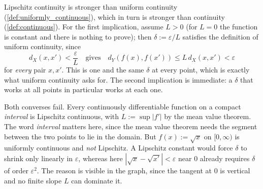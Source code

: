 \begin{remark}
\label{rem:continuity_hierarchy}
Lipschitz continuity is stronger than uniform continuity
(\cref{def:uniformly_continuous}), which in turn is stronger than continuity
(\cref{def:continuous}). For the first implication, assume $L > 0$ (for $L = 0$ the function is
constant and there is nothing to prove); then $\delta := \varepsilon/L$ satisfies the definition
of uniform continuity, since
\[d_X(x,x') < \frac{\varepsilon}{L} \quad \text{gives} \quad d_Y(f(x),f(x')) \leq L\,d_X(x,x') < \varepsilon\]
for \emph{every} pair $x,x'$. This is one and the same $\delta$ at every point, which is exactly
what uniform continuity asks for. The second implication is immediate: a $\delta$ that works at
all points in particular works at each one.

Both converses fail. Every continuously differentiable function on a compact \emph{interval} is
Lipschitz continuous, with $L := \sup|f'|$ by the mean value theorem. The word \emph{interval}
matters here, since the mean value theorem needs the segment between the two points to lie in the
domain. But $f(x) := \sqrt{x}$ on $[0,\infty)$ is uniformly continuous and \emph{not} Lipschitz.
A Lipschitz constant would force $\delta$ to shrink only linearly in $\varepsilon$, whereas here
$|\sqrt{x}-\sqrt{x'}| < \varepsilon$ near $0$ already requires $\delta$ of order
$\varepsilon^2$. The reason is visible in the graph, since the tangent at $0$ is vertical and no
finite slope $L$ can dominate it.
\end{remark}

